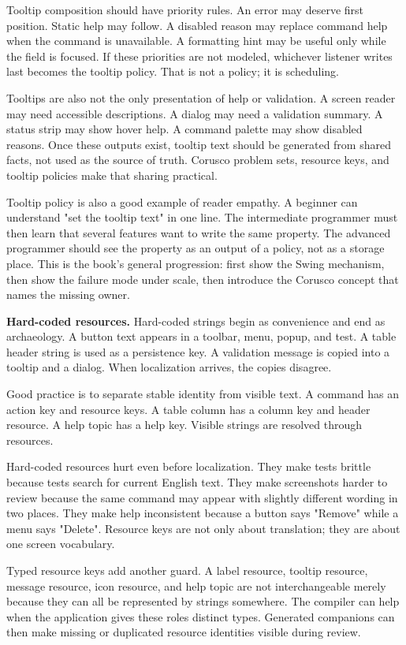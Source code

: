 Tooltip composition should have priority rules. An error may deserve first
position. Static help may follow. A disabled reason may replace command help
when the command is unavailable. A formatting hint may be useful only while the
field is focused. If these priorities are not modeled, whichever listener writes
last becomes the tooltip policy. That is not a policy; it is scheduling.

Tooltips are also not the only presentation of help or validation. A screen
reader may need accessible descriptions. A dialog may need a validation summary.
A status strip may show hover help. A command palette may show disabled
reasons. Once these outputs exist, tooltip text should be generated from shared
facts, not used as the source of truth. Corusco problem sets, resource keys, and
tooltip policies make that sharing practical.

Tooltip policy is also a good example of reader empathy. A beginner can
understand "set the tooltip text" in one line. The intermediate programmer must
then learn that several features want to write the same property. The advanced
programmer should see the property as an output of a policy, not as a storage
place. This is the book's general progression: first show the Swing mechanism,
then show the failure mode under scale, then introduce the Corusco concept that
names the missing owner.

\textbf{Hard-coded resources.}
Hard-coded strings begin as convenience and end as archaeology. A button text appears in a toolbar, menu, popup, and test. A table header string is used as a persistence key. A validation message is copied into a tooltip and a dialog. When localization arrives, the copies disagree.

Good practice is to separate stable identity from visible text. A command has an action key and resource keys. A table column has a column key and header resource. A help topic has a help key. Visible strings are resolved through resources.

Hard-coded resources hurt even before localization. They make tests brittle
because tests search for current English text. They make screenshots harder to
review because the same command may appear with slightly different wording in
two places. They make help inconsistent because a button says "Remove" while a
menu says "Delete". Resource keys are not only about translation; they are about
one screen vocabulary.

Typed resource keys add another guard. A label resource, tooltip resource,
message resource, icon resource, and help topic are not interchangeable merely
because they can all be represented by strings somewhere. The compiler can help
when the application gives these roles distinct types. Generated companions can
then make missing or duplicated resource identities visible during review.

